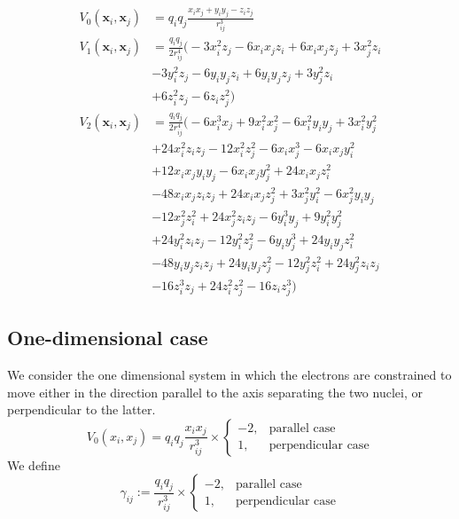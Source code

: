 \documentclass[reprint, amsmath, amssymb, aps]{revtex4-2}
\begin{document}
    \begin{align*}
        V_0(\bm{x} _i, \bm{x} _j) &= q_iq_j\frac{x_ix_j + y_iy_j - z_iz_j}{r_{ij}^3}\\
        V_1(\bm{x} _i, \bm{x} _j) &= \frac{q_iq_j}{2r_{ij}^4}\big(-3  x_i ^2  z_j -6  x_i   x_j   z_i +6  x_i   x_j   z_j +3  x_j ^2  z_i\\
        & -3  y_i ^2  z_j -6  y_i   y_j   z_i +6  y_i   y_j   z_j +3  y_j ^2  z_i\\
        & +6  z_i ^2  z_j -6  z_i   z_j ^2\big)\\
        V_2(\bm{x} _i, \bm{x} _j) &= \frac{q_iq_j}{2 r_{ij}^4}\big(-6  x_i ^3  x_j +9  x_i ^2  x_j ^2-6  x_i ^2  y_i   y_j +3  x_i ^2  y_j ^2\\
        &+24  x_i ^2  z_i   z_j -12  x_i ^2  z_j ^2-6  x_i   x_j ^3-6  x_i   x_j   y_i ^2\\
        &+12  x_i   x_j   y_i   y_j -6  x_i   x_j   y_j ^2+24  x_i   x_j   z_i ^2\\
        &-48  x_i   x_j   z_i   z_j +24  x_i   x_j   z_j ^2+3  x_j ^2  y_i ^2-6  x_j ^2  y_i   y_j \\
        &-12  x_j ^2  z_i ^2+24  x_j ^2  z_i   z_j -6  y_i ^3  y_j +9  y_i ^2  y_j ^2\\
        &+24  y_i ^2  z_i   z_j -12  y_i ^2  z_j ^2-6  y_i   y_j ^3+24  y_i   y_j   z_i ^2\\
        &-48  y_i   y_j   z_i   z_j +24  y_i   y_j   z_j ^2-12  y_j ^2  z_i ^2+24  y_j ^2  z_i   z_j \\
        &-16  z_i ^3  z_j +24  z_i ^2  z_j ^2-16  z_i   z_j ^3\big)
    \end{align*}

        \subsection{One-dimensional case}

        We consider the one dimensional system in which the electrons are constrained to move either in the direction parallel to the axis separating the two nuclei, or perpendicular to the latter.
        \begin{equation}
            V_0(x_i, x_j) = q_iq_j\frac{x_ix_j}{r_{ij}^3}\times
            \begin{cases}
                -2, & \text{parallel case} \\
                1, & \text{perpendicular case}
            \end{cases}
        \end{equation}
        We define
        \begin{equation}
            \gamma_{ij} := \frac{q_iq_j}{r_{ij}^3}\times
            \begin{cases}
                -2, & \text{parallel case} \\
                1, & \text{perpendicular case}
            \end{cases}
        \end{equation}
\end{document}
